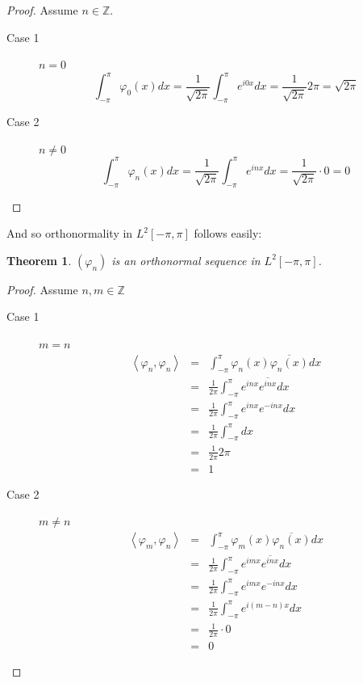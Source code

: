 \documentclass[letterpaper,12pt,fleqn,reqno]{amsart}
\theoremstyle{plain}
\newtheorem{theorem}{Theorem}[section]
\newcommand{\Z}{\mathbb{Z}}
\newcommand{\vp}{\varphi}
\newcommand{\Ltp}{L^2[-\pi,\pi]}
\newcommand{\inner}[1]{\left<#1\right>}
\newcommand{\conj}[1]{\overline{#1}}
\begin{document}
\begin{proof}
  Assume $n\in\Z$.

  \begin{description}
  \item[Case 1] $n=0$
    \[\int_{-\pi}^{\pi}\vp_0(x)dx=\frac{1}{\sqrt{2\pi}}\int_{-\pi}^{\pi}e^{i0x}dx=
    \frac{1}{\sqrt{2\pi}}2\pi=\sqrt{2\pi}\]

  \item[Case 2] $n\ne0$
    \[\int_{-\pi}^{\pi}\vp_n(x)dx=\frac{1}{\sqrt{2\pi}}\int_{-\pi}^{\pi}e^{inx}dx=
    \frac{1}{\sqrt{2\pi}}\cdot0=0\]
  \end{description}
\end{proof}

And so orthonormality in $\Ltp$ follows easily:

\begin{theorem}
  $(\vp_n)$ is an orthonormal sequence in $\Ltp$.
\end{theorem}

\begin{proof}
  Assume $n,m\in\Z$

  \begin{description}
  \item[Case 1] $m=n$
    \begin{eqnarray*}
      \inner{\vp_n,\vp_n} &=& \int_{-\pi}^{\pi}\vp_n(x)\conj{\vp_n(x)}dx \\
      &=& \frac{1}{2\pi}\int_{-\pi}^{\pi}e^{inx}\conj{e^{inx}}dx \\
      &=& \frac{1}{2\pi}\int_{-\pi}^{\pi}e^{inx}e^{-inx}dx \\
      &=& \frac{1}{2\pi}\int_{-\pi}^{\pi}dx \\
      &=& \frac{1}{2\pi}2\pi \\
      &=& 1
    \end{eqnarray*}
    
  \item[Case 2] $m\ne n$
    \begin{eqnarray*}
      \inner{\vp_m,\vp_n} &=& \int_{-\pi}^{\pi}\vp_m(x)\conj{\vp_n(x)}dx \\
      &=& \frac{1}{2\pi}\int_{-\pi}^{\pi}e^{imx}\conj{e^{inx}}dx \\
      &=& \frac{1}{2\pi}\int_{-\pi}^{\pi}e^{imx}e^{-inx}dx \\
      &=& \frac{1}{2\pi}\int_{-\pi}^{\pi}e^{i(m-n)x}dx \\
      &=& \frac{1}{2\pi}\cdot0 \\
      &=& 0
    \end{eqnarray*}
  \end{description}
\end{proof}
\end{document}
